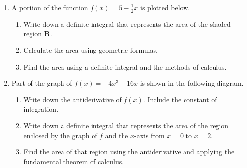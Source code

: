 \documentclass[12pt, twoside]{article}
\begin{document}
\begin{enumerate}
\newpage
\item A portion of the function $f(x)=5-\frac{1}{2}x$ is plotted below.
  \begin{enumerate}
    \item Write down a definite integral that represents the area of the shaded region $\mathbf{R}$. \vspace{1.5cm}
    \item Calculate the area using geometric formulas.
      \begin{flushright}
      \end{flushright}
    \item Find the area using a definite integral and the methods of calculus. \vspace{2cm}
  \end{enumerate}

\newpage
    \item Part of the graph of $f(x)=-4x^3+16x$ is shown in the following diagram.
    \begin{center}
    \end{center}
  \begin{enumerate}
    \item Write down the antiderivative of $f(x)$. Include the constant of integration. \vspace{2cm}
    \item Write down a definite integral that represents the area of the region enclosed by the graph of $f$ and the $x$-axis from $x=0$ to $x=2$. \vspace{1.5cm}
    \item Find the area of that region using the antiderivative and applying the fundamental theorem of calculus.
  \end{enumerate}


\end{enumerate}
\end{document}
